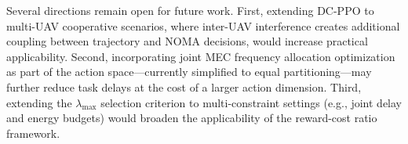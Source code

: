 \documentclass[journal]{IEEEtran}
\begin{document}
Several directions remain open for future work.
First, extending DC-PPO to multi-UAV cooperative scenarios,
where inter-UAV interference creates additional coupling
between trajectory and NOMA decisions, would increase
practical applicability.
Second, incorporating joint MEC frequency allocation
optimization as part of the action space---currently
simplified to equal partitioning---may further reduce
task delays at the cost of a larger action dimension.
Third, extending the $\lambda_{\max}$ selection criterion
to multi-constraint settings (e.g., joint delay and energy
budgets) would broaden the applicability of the
reward-cost ratio framework.



\end{document}

